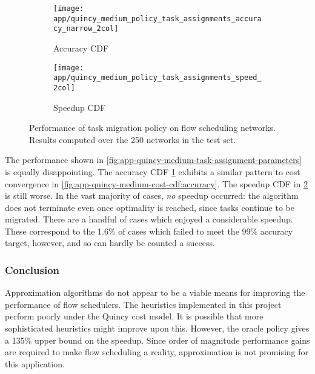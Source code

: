 \begin{figure}
    \begin{widepage}
        \begin{subfigure}[c]{0.5\textwidth}
            \texttt{[image: app/quincy\_medium\_policy\_task\_assignments\_accuracy\_narrow\_2col]}
            \caption{Accuracy CDF}
            \label{fig:app-quincy-medium-task-assignment-cdf:accuracy}
        \end{subfigure}
        \begin{subfigure}[c]{0.5\textwidth}
            \texttt{[image: app/quincy\_medium\_policy\_task\_assignments\_speed\_2col]}
            \caption{Speedup CDF}
            \label{fig:app-quincy-medium-task-assignment-cdf:speedup}
        \end{subfigure}
    \end{widepage}
    \caption[Performance of task migration policy on flow scheduling networks]{Performance of task migration policy on flow scheduling networks. Results computed over the 250 networks in the test set.}
    \label{fig:app-quincy-medium-task-assignment-cdf}
\end{figure}

The performance shown in \cref{fig:app-quincy-medium-task-assignment-parameters} is equally disappointing. The accuracy CDF \cref{fig:app-quincy-medium-task-assignment-cdf:accuracy} exhibits a similar pattern to cost convergence in \cref{fig:app-quincy-medium-cost-cdf:accuracy}. The speedup CDF in \cref{fig:app-quincy-medium-task-assignment-cdf:speedup} is still worse. In the vast majority of cases, \emph{no} speedup occurred: the algorithm does not terminate even once optimality is reached, since tasks continue to be migrated. There are a handful of cases which enjoyed a considerable speedup. These correspond to the 1.6\% of cases which failed to meet the 99\% accuracy target, however, and so can hardly be counted a success.

\subsubsection{Conclusion}

Approximation algorithms do not appear to be a viable means for improving the performance of flow schedulers. The heuristics implemented in this project perform poorly under the Quincy cost model. It is possible that more sophisticated heuristics might improve upon this. However, the oracle policy gives a 135\% upper bound on the speedup. Since order of magnitude performance gains are required to make flow scheduling a reality, approximation is not promising for this application.

